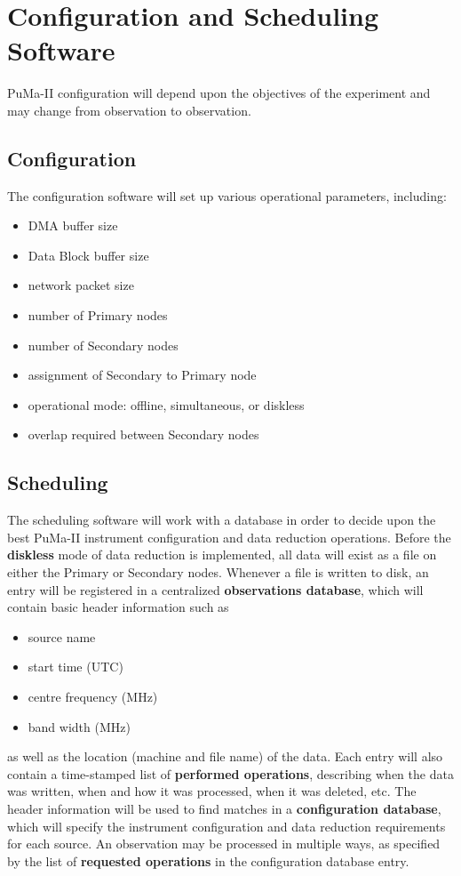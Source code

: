 \chapter{Configuration and Scheduling Software}

PuMa-II configuration will depend upon the objectives of the
experiment and may change from observation to observation.

\section{Configuration}

The configuration software will set up various operational parameters,
including:

\begin{itemize}
\item DMA buffer size
\item Data Block buffer size
\item network packet size
\item number of Primary nodes
\item number of Secondary nodes
\item assignment of Secondary to Primary node
\item operational mode: offline, simultaneous, or diskless
\item overlap required between Secondary nodes
\end{itemize}

\section{Scheduling}

The scheduling software will work with a database in order to decide
upon the best PuMa-II instrument configuration and data reduction
operations.  Before the {\bf diskless} mode of data reduction is
implemented, all data will exist as a file on either the Primary or
Secondary nodes.  Whenever a file is written to disk, an entry will be
registered in a centralized {\bf observations database}, which will
contain basic header information such as
\begin{itemize}
\item source name
\item start time (UTC)
\item centre frequency (MHz)
\item band width (MHz)
\end{itemize}
as well as the location (machine and file name) of the data.  Each
entry will also contain a time-stamped list of {\bf performed
operations}, describing when the data was written, when and how it was
processed, when it was deleted, etc.  The header information will be
used to find matches in a {\bf configuration database}, which will
specify the instrument configuration and data reduction requirements
for each source.  An observation may be processed in multiple ways, as
specified by the list of {\bf requested operations} in the
configuration database entry.

